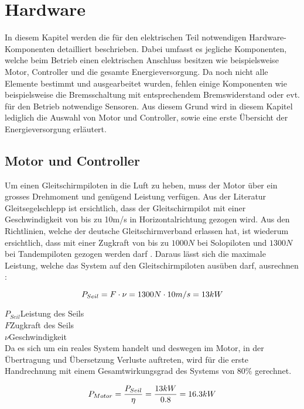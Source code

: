 \section{Hardware}\label{sec:Hardware}
In diesem Kapitel werden die für den elektrischen Teil notwendigen Hardware-Komponenten detailliert beschrieben. Dabei umfasst es jegliche Komponenten, welche beim Betrieb einen elektrischen Anschluss besitzen wie beispielsweise Motor, Controller und die gesamte Energieversorgung. Da noch nicht alle Elemente bestimmt und ausgearbeitet wurden, fehlen einige Komponenten wie beispielsweise die Bremsschaltung mit entsprechendem Bremswiderstand oder evt. für den Betrieb notwendige Sensoren. Aus diesem Grund wird in diesem Kapitel lediglich die Auswahl von Motor und Controller, sowie eine erste Übersicht der Energieversorgung erläutert.


\subsection{Motor und Controller}\label{subsec:MotorController}
Um einen Gleitschirmpiloten in die Luft zu heben, muss der Motor über ein grosses Drehmoment und genügend Leistung verfügen. Aus der Literatur Gleitsegelschlepp \cite{Gleitsegelschlepp} ist ersichtlich, dass der Gleitschirmpilot mit einer Geschwindigkeit von bis zu 10m/s in Horizontalrichtung gezogen wird. Aus den Richtlinien, welche der deutsche Gleitschirmverband erlassen hat, ist wiederum ersichtlich, dass mit einer Zugkraft von bis zu $ 1000N $ bei Solopiloten und $ 1300N $ bei Tandempiloten gezogen werden darf \cite{WindenProtokoll}. Daraus lässt sich die maximale Leistung, welche das System auf den Gleitschirmpiloten ausüben darf, ausrechnen \cite{Kuchling}:


\begin{equation}
\centering
	P_{Seil}=F \cdot \nu=1300N \cdot 10m/s=13kW
\label{eq:LeistungSeil}
\end{equation}

$ P_{Seil} $\quad 	Leistung des Seils     \\
$ F $\qquad  Zugkraft des Seils    \\
$ \nu $\qquad  Geschwindigkeit     \\

Da es sich um ein reales System handelt und deswegen im Motor, in der Übertragung und Übersetzung Verluste auftreten, wird für die erste Handrechnung mit einem Gesamtwirkungsgrad des Systems von $80\%$ gerechnet.

\begin{equation}
\centering
	P_{Motor}=\frac{P_{Seil}}{\eta}=\frac{13kW}{0.8}=16.3kW
\label{eq:LeistungMotor}
\end{equation}

